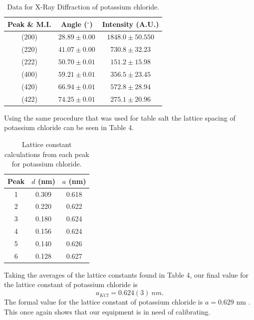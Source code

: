 \documentclass[twocolumn]{article}
\begin{document}
\begin{table}[htp]
\begin{center}
\begin{tabular}{|c|c|c|}
	\hline \small{\textbf{Peak \& M.I.}} & \small{\textbf{Angle ($^{\circ}$)}} & \small{\textbf{Intensity (A.U.)}} \\ \hline
	(200)& $28.89\pm0.00$ & $1848.0\pm50.550$ \\ \hline
	(220)& $41.07\pm0.00$ & $730.8\pm32.23$ \\ \hline
	(222)& $50.70\pm0.01$ & $151.2\pm15.98$ \\ \hline
	(400)& $59.21\pm0.01$ & $356.5\pm23.45$ \\ \hline
	(420)& $66.94\pm0.01$ & $572.8\pm28.94$ \\ \hline
	(422)& $74.25\pm0.01$ & $275.1\pm20.96$ \\ \hline
\end{tabular}
\caption{Data for X-Ray Diffraction of potassium chloride.}
\end{center}
\label{default}
\end{table}%
\newline
Using the same procedure that was used for table salt the lattice spacing of potassium chloride can be seen in Table 4.
\begin{table}[htp]
\begin{center}
\begin{tabular}{|c|c|c|}
	\hline \small\textbf{{Peak}} &\small{\textbf{$d$ (nm)}} & \small{\textbf{$a$ (nm)}} \\ \hline
	1 & 0.309 & 0.618 \\ \hline
	2 & 0.220 & 0.622 \\ \hline
	3 & 0.180 & 0.624 \\ \hline
	4 & 0.156 & 0.624 \\ \hline
	5 & 0.140 & 0.626 \\ \hline
	6 & 0.128 & 0.627 \\ \hline
\end{tabular}
\caption{Lattice constant calculations from each peak for potassium chloride.}
\end{center}
\label{default}
\end{table}%
\newline
Taking the averages of the lattice constants found in Table 4, our final value for the lattice constant of potassium chloride is
\begin{equation}
a_{KCl}=0.624(3) \ nm.
\end{equation}
The formal value for the lattice constant of potassium chloride is $a=0.629$ nm \cite{WikiLattice}. This once again shows that our equipment is in need of calibrating.
\end{document}
